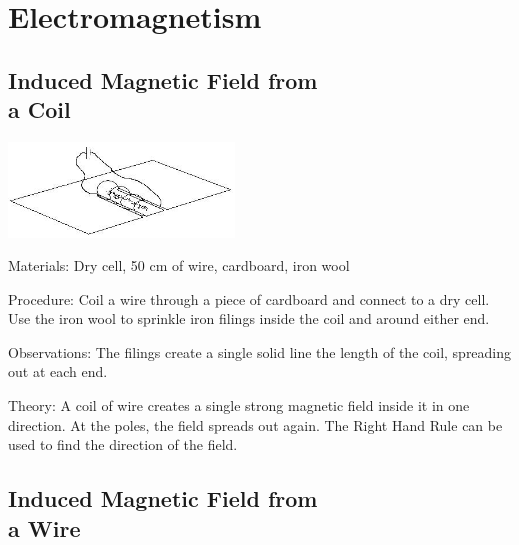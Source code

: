\section{Electromagnetism} 

\begin{multicols}{2}


\subsection[Induced Magnetic Field from a Coil]{Induced Magnetic Field from \hfill \\ a Coil}

\begin{center}
\includegraphics[width=0.45\textwidth]{./img/induced-mag-field-coil.png}
\end{center}

\begin{description*}
\item[Materials:]{Dry cell, 50 cm of wire, cardboard, iron wool}
\item[Procedure:]{Coil a wire through a piece of cardboard and connect to a dry cell. Use the iron wool to sprinkle iron filings inside the coil and around either end.}
\item[Observations:]{The filings create a single solid line the length of the coil, spreading out at each end.}
\item[Theory:]{A coil of wire creates a single strong magnetic field inside it in one direction. At the poles, the field spreads out again. The Right Hand Rule can be used to find the direction of the field.}
\end{description*}

\subsection[Induced Magnetic Field from a Wire]{Induced Magnetic Field from \hfill \\ a Wire}


\end{multicols}
